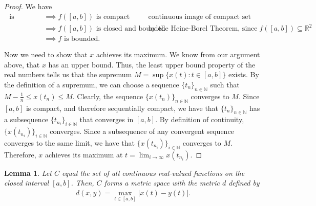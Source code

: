 \documentclass[10pt,a4paper]{article}
\theoremstyle{theorem}
\newtheorem{lemma}{Lemma}
\theoremstyle{definition}
\begin{document}
\begin{proof}
We have
\begin{align*}
[a, b] \text{ is compact} &\implies f([a, b]) \text{ is compact} && \text{continuous image of compact set}\\
&\implies f([a, b]) \text{ is closed and bounded} && \text{by the Heine-Borel Theorem, since } f([a, b]) \subseteq \mathbb{R}^2\\
&\implies f \text{ is bounded}.
\end{align*}

Now we need to show that $x$ achieves its maximum.  We know from our argument above, that $x$ has an upper bound. Thus, the least upper bound property of the real numbers tells us that the supremum $M = \sup \{x(t): t \in [a, b] \}$ exists. By the definition of a supremum, we can choose a sequence $\{t_n \}_{n \in \mathbb{N}}$ such that $M- \frac{1}{n} \leq x(t_n) \leq M$. Clearly, the sequence $\{x(t_n)\}_{n \in \mathbb{N}}$ converges to $M$. Since $[a, b]$ is compact, and therefore sequentially compact, we have that $\{t_n \}_{n \in \mathbb{N}}$ has a subsequence $\{t_{n_i} \}_{i \in \mathbb{N}}$ that converges in $[a, b]$. By definition of continuity, $\{x(t_{n_i}) \}_{i \in \mathbb{N}}$ converges. Since a subsequence of any convergent sequence converges to the same limit, we have that $\{x(t_{n_i}) \}_{i \in \mathbb{N}}$ converges to $M$. Therefore,  $x$ achieves its maximum at $t = \lim_{i \to \infty} x(t_{n_i})$.
\end{proof}

\begin{lemma}
Let $C$ equal the set of all continuous real-valued functions on the closed interval $[a, b]$. Then, $C$ forms a metric space with the metric $d$ defined by
\begin{align*}
d(x, y) = \max_{t \in [a, b]} |x(t) - y(t)|.
\end{align*}
\end{lemma}
\end{document}
